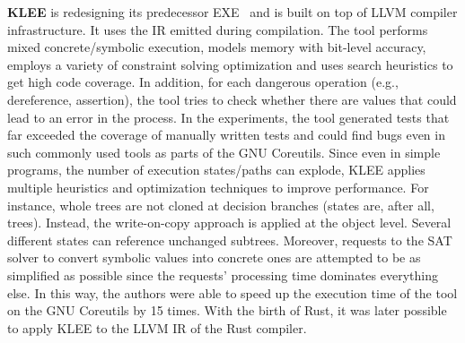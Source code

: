 \documentclass{article}
\begin{document}

\textbf{KLEE} is redesigning its predecessor EXE~\cite{Cadar2008} and is built on top of LLVM compiler infrastructure. It uses the \ac{IR} emitted during compilation. The tool performs mixed concrete/symbolic execution, models memory with bit-level accuracy, employs a variety of constraint solving optimization and uses search heuristics to get high code coverage. In addition, for each dangerous operation (e.g., dereference, assertion), the tool tries to check whether there are values that could lead to an error in the process. In the experiments, the tool generated tests that far exceeded the coverage of manually written tests and could find bugs even in such commonly used tools as parts of the GNU Coreutils. Since even in simple programs, the number of execution states/paths can explode, KLEE applies multiple heuristics and optimization techniques to improve performance. For instance, whole trees are not cloned at decision branches (states are, after all, trees). Instead, the write-on-copy approach is applied at the object level. Several different states can reference unchanged subtrees. Moreover, requests to the SAT solver to convert symbolic values into concrete ones are attempted to be as simplified as possible since the requests' processing time dominates everything else. In this way, the authors were able to speed up the execution time of the tool on the GNU Coreutils by 15 times. With the birth of Rust, it was later possible to apply KLEE to the LLVM IR of the Rust compiler. 
\end{document}

